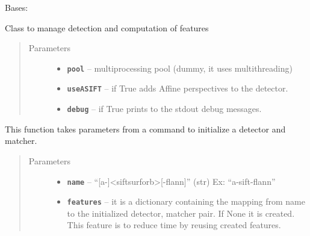\documentclass[letterpaper,10pt,english]{sphinxmanual}
\begin{document}

\begin{fulllineitems}
\label{RRtoolbox.lib:RRtoolbox.lib.descriptors.Feature}
Bases: 

Class to manage detection and computation of features
\begin{quote}\begin{description}
\item[{Parameters}] \leavevmode\begin{itemize}
\item {} 
\textbf{\texttt{pool}} -- multiprocessing pool (dummy, it uses multithreading)

\item {} 
\textbf{\texttt{useASIFT}} -- if True adds Affine perspectives to the detector.

\item {} 
\textbf{\texttt{debug}} -- if True prints to the stdout debug messages.

\end{itemize}

\end{description}\end{quote}

\begin{fulllineitems}
\label{RRtoolbox.lib:RRtoolbox.lib.descriptors.Feature.config}
This function takes parameters from a command to initialize a detector and matcher.
\begin{quote}\begin{description}
\item[{Parameters}] \leavevmode\begin{itemize}
\item {} 
\textbf{\texttt{name}} -- ``{[}a-{]}\textless{}sift\textbar{}surf\textbar{}orb\textgreater{}{[}-flann{]}'' (str) Ex: ``a-sift-flann''

\item {} 
\textbf{\texttt{features}} -- it is a dictionary containing the mapping from name to the
initialized detector, matcher pair. If None it is created.
This feature is to reduce time by reusing created features.


\end{itemize}
\end{description}
\end{quote}
\end{fulllineitems}
\end{fulllineitems}
\end{document}
